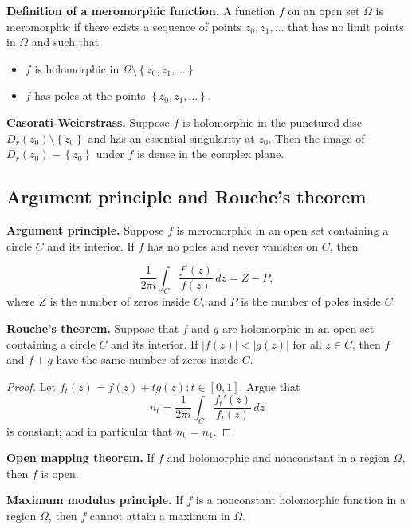 \documentclass[12pt]{article}
\begin{document}
        {\bf Definition of a meromorphic function.} A function $f$ on an open set $\Omega$ is meromorphic if there exists a sequence of points $z_0, z_1, \dots$ that has no limit points in $\Omega$ and such that

        \begin{itemize}
          \item $f$ is holomorphic in $\Omega \setminus \left\{ z_0, z_1, \dots \right\}$
          \item $f$ has poles at the points $\left\{ z_0, z_1, \dots \right\}$.
        \end{itemize}

        {\bf Casorati-Weierstrass.} Suppose $f$ is holomorphic in the punctured disc $D_r(z_0) \setminus \left\{ z_0 \right\}$ and has an essential singularity  at $z_0$.  Then the image of $D_r(z_0) - \left\{ z_0 \right\}$ under $f$ is dense in the complex plane.

        \subsection{Argument principle and Rouche's theorem}

        {\bf Argument principle.} Suppose $f$ is meromorphic in an open set containing a circle $C$ and its interior.  If $f$ has no poles and never vanishes on $C$, then

        \[
          \frac{1}{2 \pi i} \int_{C} \frac{f'(z)}{f(z)} \, dz =Z - P,
        \]
        where $Z$ is the number of zeros inside $C$, and $P$ is the number of poles inside $C$.

        {\bf Rouche's theorem.} Suppose that $f$ and $g$ are holomorphic in an open set containing a circle $C$ and its interior.  If $|f(z)| < |g(z)|$ for all $z \in C$, then $f$ and $f+g$ have the same number of zeros inside $C$.

        \begin{proof}
          Let $f_t(z) = f(z) + t g(z); t \in [0, 1]$.
          Argue that
          \[
            n_t = \frac{1}{2 \pi i} \int_{C} \frac{f_t'(z)}{f_t(z)} \, dz
            \]
            is constant; and in particular that $n_0 = n_1$.
        \end{proof}

        {\bf Open mapping theorem.} If $f$ and holomorphic and nonconstant in a region $\Omega$, then $f$ is open.

        {\bf Maximum modulus principle.} If $f$ is a nonconstant holomorphic function in a region $\Omega$, then $f$ cannot attain a maximum in $\Omega$.
\end{document}
